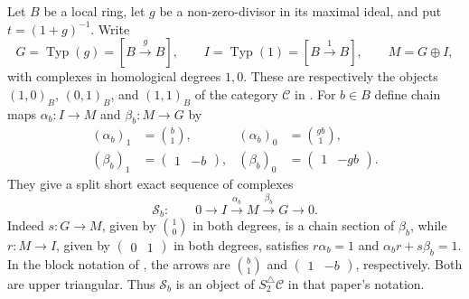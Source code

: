 \documentclass[11pt,a4paper]{article}
\theoremstyle{remark}
\begin{document}
Let $B$ be a local ring, let $g$ be a non-zero-divisor in its maximal
ideal, and put $t=(1+g)^{-1}$. Write
\[
G=\operatorname{Typ}(g)=[B\xrightarrow{g}B],\qquad
I=\operatorname{Typ}(1)=[B\xrightarrow{1}B],\qquad M=G\oplus I,
\]
with complexes in homological degrees $1,0$. These are respectively
the objects $(1,0)_B$, $(0,1)_B$, and $(1,1)_B$ of the category $\mathcal C$
in \cite[Definition~9]{MochizukiParameters}. For $b\in B$ define
chain maps $\alpha_b:I\to M$ and $\beta_b:M\to G$ by
\begin{align*}
(\alpha_b)_1&=\binom{b}{1},&
(\alpha_b)_0&=\binom{gb}{1},\\
(\beta_b)_1&=\begin{pmatrix}1&-b\end{pmatrix},&
(\beta_b)_0&=\begin{pmatrix}1&-gb\end{pmatrix}.
\end{align*}
They give a split short exact sequence of complexes
\[
\mathcal S_b:\qquad 0\longrightarrow I\xrightarrow{\alpha_b}
M\xrightarrow{\beta_b}G\longrightarrow0.
\]
Indeed $s:G\to M$, given by $\binom10$ in both degrees, is a
chain section of $\beta_b$, while $r:M\to I$, given by
$\begin{pmatrix}0&1\end{pmatrix}$ in both degrees, satisfies
$r\alpha_b=1$ and $\alpha_b r+s\beta_b=1$. In the block notation
of \cite[Conventions~11]{MochizukiParameters}, the arrows are
$\binom b1$ and $\begin{pmatrix}1&-b\end{pmatrix}$, respectively.
Both are upper triangular. Thus $\mathcal S_b$ is an object of
$S_2^{\triangle}\mathcal C$ in that paper's notation.
\end{document}
